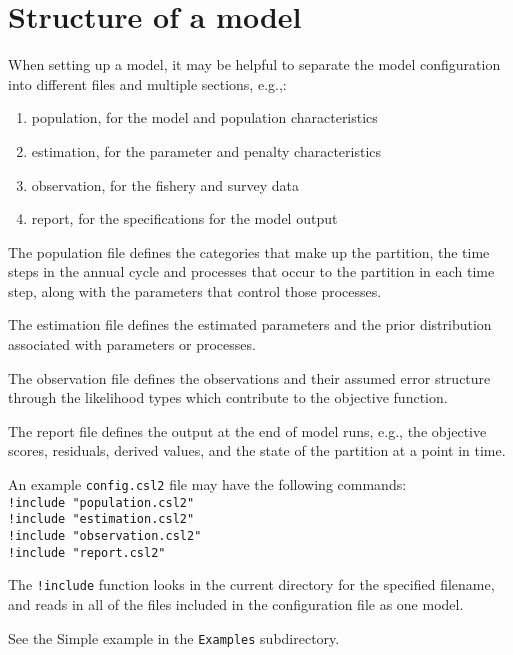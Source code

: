\section{Structure of a model}\label{Sec:model}

When setting up a model, it may be helpful to separate the model configuration into different files and multiple sections, e.g.,:

\begin{enumerate}
\item population, for the model and population characteristics
\item estimation, for the parameter and penalty characteristics
\item observation, for the fishery and survey data
\item report, for the specifications for the model output
\end{enumerate}

The population file defines the categories that make up the partition, the time steps in the annual cycle and processes that occur to the partition in each time step, along with the parameters that control those processes.

The estimation file defines the estimated parameters and the prior distribution associated with parameters or processes.

The observation file defines the observations and their assumed error structure through the likelihood types which contribute to the objective function.

The report file defines the output at the end of model runs, e.g., the objective scores, residuals, derived values, and the state of the partition at a point in time.

An example \texttt{config.csl2} file may have the following commands:\\
\texttt{!include "population.csl2"}\\
\texttt{!include "estimation.csl2"}\\
\texttt{!include "observation.csl2"}\\
\texttt{!include "report.csl2"}

The \texttt{!include} function looks in the current directory for the specified filename, and reads in all of the files included in the configuration file as one model.

See the Simple example in the \texttt{Examples} subdirectory.

